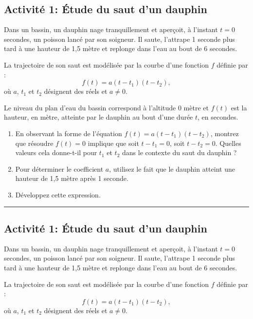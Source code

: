 \documentclass{article}
\date{}
\begin{document}
\begin{center}
\section*{Activité 1: Étude du saut d'un dauphin}
\end{center}

Dans un bassin, un dauphin nage tranquillement et aperçoit, à l’instant $t = 0$ secondes, un poisson lancé par son soigneur. Il saute, l’attrape 1 seconde plus tard à une hauteur de 1,5 mètre et replonge dans l’eau au bout de 6 secondes.

La trajectoire de son saut est modélisée par la courbe d'une fonction $f$ définie par :
$$
f(t) = a (t - t_1)(t - t_2),
$$
où $a$, $t_1$ et $t_2$ désignent des réels et $a \neq 0$.

Le niveau du plan d’eau du bassin correspond à l’altitude 0 mètre et $f(t)$ est la hauteur, en mètre, atteinte par le dauphin au bout d’une durée $t$, en secondes.

\begin{enumerate}
    \item En observant la forme de l'équation $f(t) = a (t - t_1)(t - t_2)$, montrez que résoudre $f(t) = 0$ implique que soit $t - t_1 = 0$, soit $t - t_2 = 0$. Quelles valeurs cela donne-t-il pour $t_1$ et $t_2$ dans le contexte du saut du dauphin ?

    \item Pour déterminer le coefficient $a$, utilisez le fait que le dauphin atteint une hauteur de 1,5 mètre après 1 seconde.

    \item Développez cette expression.
\end{enumerate}

\hrule

\begin{center}
\section*{Activité 1: Étude du saut d'un dauphin}
\end{center}

Dans un bassin, un dauphin nage tranquillement et aperçoit, à l’instant $t = 0$ secondes, un poisson lancé par son soigneur. Il saute, l’attrape 1 seconde plus tard à une hauteur de 1,5 mètre et replonge dans l’eau au bout de 6 secondes.

La trajectoire de son saut est modélisée par la courbe d'une fonction $f$ définie par :
$$
f(t) = a (t - t_1)(t - t_2),
$$
où $a$, $t_1$ et $t_2$ désignent des réels et $a \neq 0$.
\end{document}
